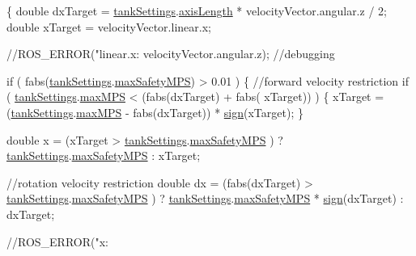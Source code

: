 \begin{DoxyCode}
\{
    \textcolor{keywordtype}{double} dxTarget = \hyperlink{classTankSteering_a6973af1afc00c9b11f32ecc7ad7e8a14}{tankSettings}.\hyperlink{structTankSteering_1_1tankSet_a546f41c6c1e7d0ba11e7a096c41d52cd}{axisLength} * 
      velocityVector.angular.z / 2;
    \textcolor{keywordtype}{double} xTarget = velocityVector.linear.x;

    \textcolor{comment}{//ROS\_ERROR("linear.x: %
       velocityVector.angular.z); //debugging}

    \textcolor{keywordflow}{if} ( fabs(\hyperlink{classTankSteering_a6973af1afc00c9b11f32ecc7ad7e8a14}{tankSettings}.\hyperlink{structTankSteering_1_1tankSet_ab604472ee21a35336e7be92ed0a9616f}{maxSafetyMPS}) > 0.01 ) \{
        \textcolor{comment}{//forward velocity restriction}
        \textcolor{keywordflow}{if} ( \hyperlink{classTankSteering_a6973af1afc00c9b11f32ecc7ad7e8a14}{tankSettings}.\hyperlink{structTankSteering_1_1tankSet_a07b9b99e1d4d281a8ffc6cca8cebfcfa}{maxMPS} < (fabs(dxTarget) + fabs(
      xTarget)) ) \{ xTarget = (\hyperlink{classTankSteering_a6973af1afc00c9b11f32ecc7ad7e8a14}{tankSettings}.\hyperlink{structTankSteering_1_1tankSet_a07b9b99e1d4d281a8ffc6cca8cebfcfa}{maxMPS} - fabs(dxTarget)) * 
      \hyperlink{classTankSteering_a89990f8796af8d4224752c0e0a0daf47}{sign}(xTarget); \}

        \textcolor{keywordtype}{double} x = (xTarget > \hyperlink{classTankSteering_a6973af1afc00c9b11f32ecc7ad7e8a14}{tankSettings}.\hyperlink{structTankSteering_1_1tankSet_ab604472ee21a35336e7be92ed0a9616f}{maxSafetyMPS}
      ) ? \hyperlink{classTankSteering_a6973af1afc00c9b11f32ecc7ad7e8a14}{tankSettings}.\hyperlink{structTankSteering_1_1tankSet_ab604472ee21a35336e7be92ed0a9616f}{maxSafetyMPS} : xTarget;

        \textcolor{comment}{//rotation velocity restriction}
        \textcolor{keywordtype}{double} dx = (fabs(dxTarget) > \hyperlink{classTankSteering_a6973af1afc00c9b11f32ecc7ad7e8a14}{tankSettings}.\hyperlink{structTankSteering_1_1tankSet_ab604472ee21a35336e7be92ed0a9616f}{maxSafetyMPS}
      ) ? \hyperlink{classTankSteering_a6973af1afc00c9b11f32ecc7ad7e8a14}{tankSettings}.\hyperlink{structTankSteering_1_1tankSet_ab604472ee21a35336e7be92ed0a9616f}{maxSafetyMPS} * \hyperlink{classTankSteering_a89990f8796af8d4224752c0e0a0daf47}{sign}(dxTarget) : 
      dxTarget;

        \textcolor{comment}{//ROS\_ERROR("x: %

}
\end{DoxyCode}
